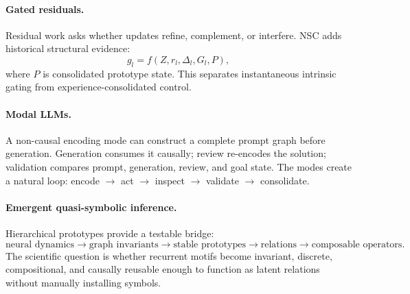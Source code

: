 \documentclass[11pt]{article}
\begin{document}
\paragraph{Gated residuals.} Residual work asks whether updates refine, complement, or interfere. NSC adds historical structural evidence:
\[
g_l=f(Z,r_l,\Delta_l,G_l,P),
\]
where $P$ is consolidated prototype state. This separates instantaneous intrinsic gating from experience-consolidated control.

\paragraph{Modal LLMs.} A non-causal encoding mode can construct a complete prompt graph before generation. Generation consumes it causally; review re-encodes the solution; validation compares prompt, generation, review, and goal state. The modes create a natural loop: encode $\rightarrow$ act $\rightarrow$ inspect $\rightarrow$ validate $\rightarrow$ consolidate.

\paragraph{Emergent quasi-symbolic inference.} Hierarchical prototypes provide a testable bridge:
\[
\text{neural dynamics}\rightarrow\text{graph invariants}\rightarrow\text{stable prototypes}\rightarrow\text{relations}\rightarrow\text{composable operators}.
\]
The scientific question is whether recurrent motifs become invariant, discrete, compositional, and causally reusable enough to function as latent relations without manually installing symbols.
\end{document}
